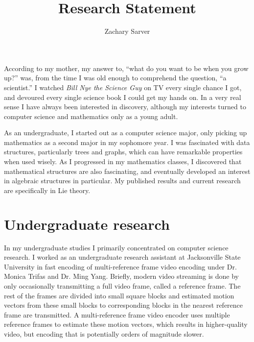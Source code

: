 \documentclass[11pt]{article}
\begin{document}
\fancyhf{}
\lhead[\thepage / \pageref{LastPage}]{Zachary Sarver}


\title{Research Statement}
\author{Zachary Sarver}
\date{}
\maketitle

According to my mother, my answer to, ``what do you want to be when you grow
up?'' was, from the time I was old enough to comprehend the question, ``a
scientist.'' I watched \textit{Bill Nye the Science Guy} on TV every single
chance I got, and devoured every single science book I could get my hands on. In
a very real sense I have always been interested in discovery, although my
interests turned to computer science and mathematics only as a young adult.

As an undergraduate, I started out as a computer science major, only picking up
mathematics as a second major in my sophomore year. I was fascinated with data
structures, particularly trees and graphs, which can have remarkable properties
when used wisely. As I progressed in my mathematics classes, I discovered that
mathematical structures are also fascinating, and eventually developed an
interest in algebraic structures in particular. My published results and current
research are specifically in Lie theory.

\section{Undergraduate research}

In my undergraduate studies I primarily concentrated on computer science
research. I worked as an undergraduate research assistant at Jacksonville State
University in fast encoding of multi-reference frame video encoding under
Dr. Monica Trifas and Dr. Ming Yang. Briefly, modern video streaming is done by
only occasionally transmitting a full video frame, called a reference frame. The
rest of the frames are divided into small square blocks and estimated motion
vectors from these small blocks to corresponding blocks in the nearest reference
frame are transmitted. A multi-reference frame video encoder uses multiple
reference frames to estimate these motion vectors, which results in
higher-quality video, but encoding that is potentially orders of magnitude
slower.
\end{document}
